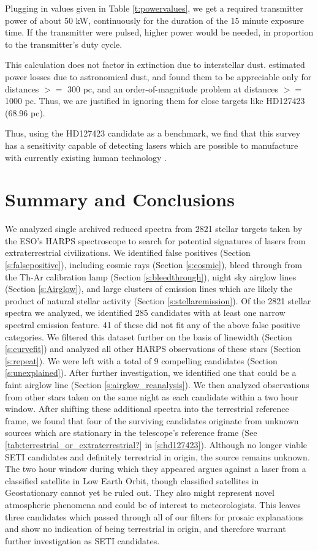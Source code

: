 \documentclass[linenumbers]{aastex631}
\begin{document}
Plugging in values given in Table \ref{t:powervalues}, we get a required transmitter power of about 50 kW, continuously for the duration of the 15 minute exposure time. If the transmitter were pulsed, higher power would be needed, in proportion to the transmitter's duty cycle. 

This calculation does not factor in extinction due to interstellar dust.  \cite{Hippke_2018} estimated power losses due to astronomical dust, and found them to be appreciable only for distances $>=$ 300 pc, and an order-of-magnitude problem at distances $>=$ 1000 pc.  Thus, we are justified in ignoring them for close targets like HD127423 (68.96 pc).

Thus, using the HD127423 candidate as a benchmark, we find that this survey has a sensitivity capable of detecting lasers which are possible to manufacture with currently existing human technology \citep{Lander1997ContinuouswaveCD}.

\section{Summary and Conclusions}
We analyzed single archived reduced spectra from 2821 stellar targets taken by the ESO’s HARPS spectroscope to search for potential signatures of lasers from extraterrestrial civilizations. We identified false positives (Section \ref{s:falsepositive}), including cosmic rays (Section \ref{s:cosmic}), bleed through from the Th-Ar calibration lamp (Section \ref{s:bleedthrough}), night sky airglow lines (Section \ref{s:Airglow}), and large clusters of emission lines which are likely the product of natural stellar activity (Section \ref{s:stellaremission}). Of the 2821 stellar spectra we analyzed, we identified 285 candidates with at least one narrow spectral emission feature.  41 of these did not fit any of the above false positive categories. We filtered this dataset further on the basis of linewidth (Section \ref{s:curvefit}) and analyzed all other HARPS observations of these stars (Section \ref{s:repeat}). We were left with a total of 9 compelling candidates (Section \ref{s:unexplained}). After further investigation, we identified one that could be a faint airglow line (Section \ref{s:airglow_reanalysis}). We then analyzed observations from other stars taken on the same night as each candidate within a two hour window. After shifting these additional spectra into the terrestrial reference frame, we found that four of the surviving candidates originate from unknown sources which are stationary in the telescope's reference frame (See 
\ref{tab:terrestrial_or_extraterrestrial?} in \ref{s:hd127423}). Although no longer viable SETI candidates and definitely terrestrial in origin, the source remains unknown. The two hour window during which they appeared argues against a laser from a classified satellite in Low Earth Orbit, though classified satellites in Geostationary cannot yet be ruled out. They also might represent novel atmospheric phenomena and could be of interest to meteorologists. This leaves three candidates which passed through all of our filters for prosaic explanations and show no indication of being terrestrial in origin, and therefore warrant further investigation as SETI candidates.
\end{document}
